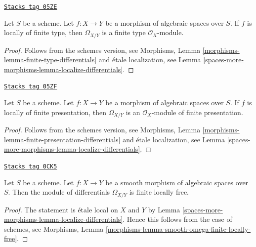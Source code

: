 \begin{lemma}
\label{spaces-more-morphisms-lemma-finite-type-differentials}
\href{https://stacks.math.columbia.edu/tag/05ZE}{\texttt{Stacks tag 05ZE}}

Let $S$ be a scheme.
Let $f : X \to Y$ be a morphism of algebraic spaces over $S$.
If $f$ is locally of finite type, then $\Omega_{X/Y}$ is
a finite type $\mathcal{O}_X$-module.
\end{lemma}

\begin{proof}
Follows from the schemes version, see
Morphisms, Lemma \ref{morphisms-lemma-finite-type-differentials}
and \'etale localization, see
Lemma \ref{spaces-more-morphisms-lemma-localize-differentials}.
\end{proof}

\begin{lemma}
\label{spaces-more-morphisms-lemma-finite-presentation-differentials}
\href{https://stacks.math.columbia.edu/tag/05ZF}{\texttt{Stacks tag 05ZF}}

Let $S$ be a scheme.
Let $f : X \to Y$ be a morphism of algebraic spaces over $S$.
If $f$ is locally of finite presentation, then $\Omega_{X/Y}$ is
an $\mathcal{O}_X$-module of finite presentation.
\end{lemma}

\begin{proof}
Follows from the schemes version, see
Morphisms, Lemma \ref{morphisms-lemma-finite-presentation-differentials}
and \'etale localization, see
Lemma \ref{spaces-more-morphisms-lemma-localize-differentials}.
\end{proof}

\begin{lemma}
\label{spaces-more-morphisms-lemma-smooth-omega-finite-locally-free}
\href{https://stacks.math.columbia.edu/tag/0CK5}{\texttt{Stacks tag 0CK5}}

Let $S$ be a scheme.
Let $f : X \to Y$ be a smooth morphism of algebraic spaces over $S$.
Then the module of differentials $\Omega_{X/Y}$
is finite locally free.
\end{lemma}

\begin{proof}
The statement is \'etale local on $X$ and $Y$ by
Lemma \ref{spaces-more-morphisms-lemma-localize-differentials}.
Hence this follows from the case of schemes, see
Morphisms, Lemma \ref{morphisms-lemma-smooth-omega-finite-locally-free}.
\end{proof}


